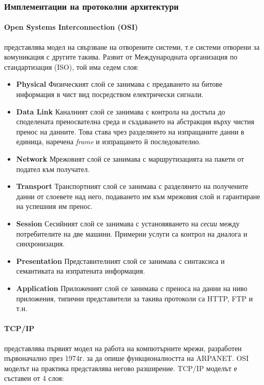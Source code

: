 \documentclass[12pt,a4paper,oneside]{book}
\begin{document}
\subsubsection{Имплементации на протоколни архитектури}

\paragraph{Open Systems Interconnection (OSI)} представлява модел на свързване
на отворените системи, т.е системи отворени за комуникация с другите такива.
Развит от Международната организация по стандартизация (ISO), той
има седем слоя:

\begin{itemize}
  \item \textbf{Physical} Физическият слой се занимава с предаването на битове
    информация в чист вид посредством електрически сигнали.
  \item \textbf{Data Link} Каналният слой се занимава с контрола на достъпа до
    споделената преносвателна среда и създаването на абстракция върху
    чистия пренос на данните. Това става чрез разделянето на
    изпращаните данни в единица, наречена \textit{frame} и изпращането й
    последователно.
  \item \textbf{Network} Мрежовият слой се занимава с маршрутизацията на
    пакети от подател към получател.
  \item \textbf{Transport} Транспортният слой се занимава с разделянето на
    получените данни от слоевете над него, подаването им към
    мрежовия слой и гарантиране на успешния им пренос.
  \item \textbf{Session} Сесийният слой се занимава с установяването на
    \textit{сесии} между потребителите на две машини. Примерни услуги са контрол
    на диалога и синхронизация.
  \item \textbf{Presentation} Представителният слой се занимава с синтаксиса и
    семантиката на изпратената информация.
  \item \textbf{Application} Приложеният слой се занимава с преноса на данни на
    ниво приложения, типични представители за такива протоколи са HTTP, FTP и
    т.н.
\end{itemize}


\paragraph{TCP/IP} представлява първият модел на работа на
компютърните мрежи, разработен първоначално през 1974г. за да опише
функционалността на ARPANET. OSI моделът на практика представлява негово
разширение. TCP/IP моделът е съставен от 4 слоя:
\end{document}
